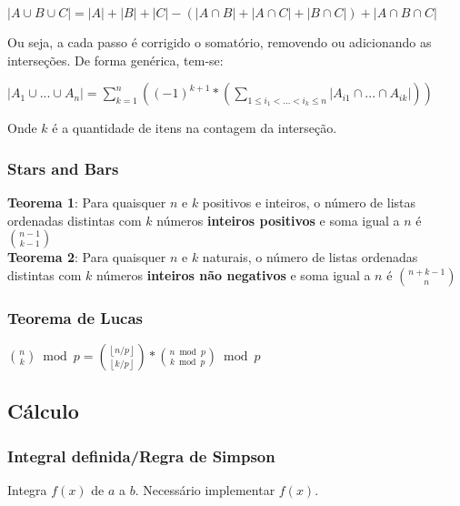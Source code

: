 $|A \cup B \cup C| = |A| + |B| + |C| - (|A \cap B| + |A \cap C| + |B \cap C|) + |A \cap B \cap C|$

Ou seja, a cada passo \'{e} corrigido o somat\'{o}rio, removendo ou adicionando as interse\c{c}\~{o}es. De forma gen\'{e}rica, tem-se:

$|A_1 \cup ... \cup A_n| = \sum_{k=1}^{n} ((-1)^{k+1}*(\sum_{1 \leq i_1 < ... < i_k \leq n} |A_{i1} \cap ... \cap A_{ik}|))$

Onde $k$ \'{e} a quantidade de itens na contagem da interse\c{c}\~{a}o.

\divisor

\subsubsection{Stars and Bars}
\textbf{Teorema 1}: Para quaisquer $n$ e $k$ positivos e inteiros, o n\'{u}mero de listas ordenadas distintas com $k$ n\'{u}meros \textbf{inteiros positivos} e soma igual a $n$ \'{e} ${n-1 \choose k-1}$ \\

\textbf{Teorema 2}: Para quaisquer $n$ e $k$ naturais, o n\'{u}mero de listas ordenadas distintas com $k$ n\'{u}meros \textbf{inteiros n\~{a}o negativos} e soma igual a $n$ \'{e} ${n+k-1 \choose n}$

\divisor

\subsubsection{Teorema de Lucas}

${n \choose k} \bmod{p} = {\left \lfloor{n/p}\right \rfloor \choose \left \lfloor{k/p}\right \rfloor} * {n \bmod{p} \choose k \bmod{p}} \bmod{p}$




\subsection{Cálculo}

\subsubsection{Integral definida/Regra de Simpson}
Integra $f(x)$ de $a$ a $b$. Necessário implementar $f(x)$.

